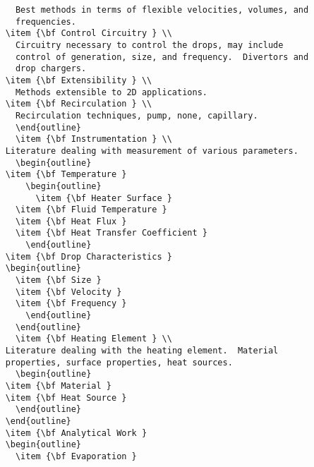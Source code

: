 \documentclass[pagesize=auto, fontsize=12pt, DIV=11]{scrartcl}
\begin{document}
\begin{lstlisting}
	  Best methods in terms of flexible velocities, volumes, and
	  frequencies.
	\item {\bf Control Circuitry } \\
	  Circuitry necessary to control the drops, may include
	  control of generation, size, and frequency.  Divertors and
	  drop chargers.
	\item {\bf Extensibility } \\
	  Methods extensible to 2D applications.
	\item {\bf Recirculation } \\
	  Recirculation techniques, pump, none, capillary.
      \end{outline}
      \item {\bf Instrumentation } \\
	Literature dealing with measurement of various parameters.
      \begin{outline}
	\item {\bf Temperature }
        \begin{outline}
          \item {\bf Heater Surface }
	  \item {\bf Fluid Temperature }
	  \item {\bf Heat Flux }
	  \item {\bf Heat Transfer Coefficient }
        \end{outline}
	\item {\bf Drop Characteristics }
	\begin{outline}
	  \item {\bf Size }
	  \item {\bf Velocity }
	  \item {\bf Frequency }
        \end{outline}
      \end{outline}
      \item {\bf Heating Element } \\
	Literature dealing with the heating element.  Material
	properties, surface properties, heat sources.
      \begin{outline}
	\item {\bf Material }
	\item {\bf Heat Source }
      \end{outline}
    \end{outline}
    \item {\bf Analytical Work }
    \begin{outline}
      \item {\bf Evaporation }

\end{lstlisting}
\end{document}
